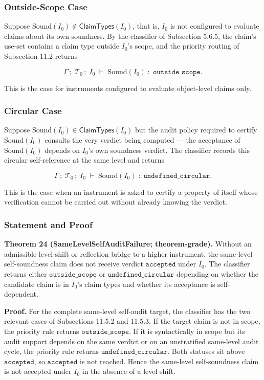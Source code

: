 \documentclass[11pt]{article}
\theoremstyle{definition}
\begin{document}
\subsubsection{Outside-Scope Case}

Suppose \(\mathrm{Sound}(I_0)\notin\mathsf{ClaimTypes}(I_0)\), that is, \(I_0\) is not configured to evaluate claims about its own soundness. By the classifier of Subsection 5.6.5, the claim's use-set contains a claim type outside \(I_0\)'s scope, and the priority routing of Subsection 11.2 returns

\[
\Gamma\,;\;\mathcal T_0\,;\;I_0\;\vdash\;\mathrm{Sound}(I_0)\;:\;\texttt{outside\_scope}.
\]

This is the case for instruments configured to evaluate object-level claims only.

\subsubsection{Circular Case}

Suppose \(\mathrm{Sound}(I_0)\in\mathsf{ClaimTypes}(I_0)\) but the audit policy required to certify \(\mathrm{Sound}(I_0)\) consults the very verdict being computed --- the acceptance of \(\mathrm{Sound}(I_0)\) depends on \(I_0\)'s own soundness verdict. The classifier records this circular self-reference at the same level and returns

\[
\Gamma\,;\;\mathcal T_0\,;\;I_0\;\vdash\;\mathrm{Sound}(I_0)\;:\;\texttt{undefined\_circular}.
\]

This is the case when an instrument is asked to certify a property of itself whose verification cannot be carried out without already knowing the verdict.

\subsubsection{Statement and Proof}

\textbf{Theorem 24 (SameLevelSelfAuditFailure; theorem-grade).} Without an admissible level-shift or reflection bridge to a higher instrument, the same-level self-soundness claim does not receive verdict \(\texttt{accepted}\) under \(I_0\). The classifier returns either \(\texttt{outside\_scope}\) or \(\texttt{undefined\_circular}\) depending on whether the candidate claim is in \(I_0\)'s claim types and whether its acceptance is self-dependent.

\textbf{Proof.} For the complete same-level self-audit target, the classifier has the two relevant cases of Subsections 11.5.2 and 11.5.3. If the target claim is not in scope, the priority rule returns \(\texttt{outside\_scope}\). If it is syntactically in scope but its audit support depends on the same verdict or on an unstratified same-level audit cycle, the priority rule returns \(\texttt{undefined\_circular}\). Both statuses sit above \(\texttt{accepted}\), so \(\texttt{accepted}\) is not reached. Hence the same-level self-soundness claim is not accepted under \(I_0\) in the absence of a level shift.
\end{document}
